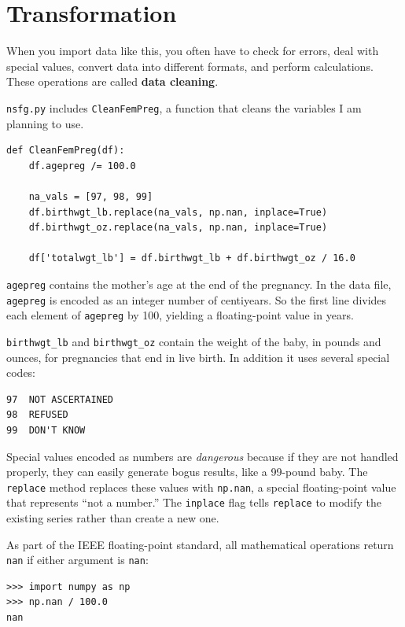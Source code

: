 \documentclass[12pt]{book}
\begin{document}
\section{Transformation}
\label{cleaning}

When you import data like this, you often have to check for errors,
deal with special values, convert data into different formats, and
perform calculations.  These operations are called {\bf data cleaning}.

{\tt nsfg.py} includes {\tt CleanFemPreg}, a function that cleans
the variables I am planning to use.

\begin{verbatim}
def CleanFemPreg(df):
    df.agepreg /= 100.0

    na_vals = [97, 98, 99]
    df.birthwgt_lb.replace(na_vals, np.nan, inplace=True)
    df.birthwgt_oz.replace(na_vals, np.nan, inplace=True)

    df['totalwgt_lb'] = df.birthwgt_lb + df.birthwgt_oz / 16.0    
\end{verbatim}

{\tt agepreg} contains the mother's age at the end of the
pregnancy.  In the data file, {\tt agepreg} is encoded as an integer
number of centiyears.  So the first line divides each element
of {\tt agepreg} by 100, yielding a floating-point value in
years.

\verb"birthwgt_lb" and \verb"birthwgt_oz" contain the weight of the
baby, in pounds and ounces, for pregnancies that end in live birth.
In addition it uses several special codes:

\begin{verbatim}
97	NOT ASCERTAINED
98	REFUSED	 
99	DON'T KNOW
\end{verbatim}

Special values encoded as numbers are {\em dangerous} because if they
are not handled properly, they can easily generate bogus results, like
a 99-pound baby.  The {\tt replace} method replaces these values with
{\tt np.nan}, a special floating-point value that represents ``not a
number.''  The {\tt inplace} flag tells {\tt replace} to modify the
existing series rather than create a new one.

As part of the IEEE floating-point standard, all mathematical
operations return {\tt nan} if either argument is {\tt nan}:

\begin{verbatim}
>>> import numpy as np
>>> np.nan / 100.0
nan
\end{verbatim}
\end{document}
